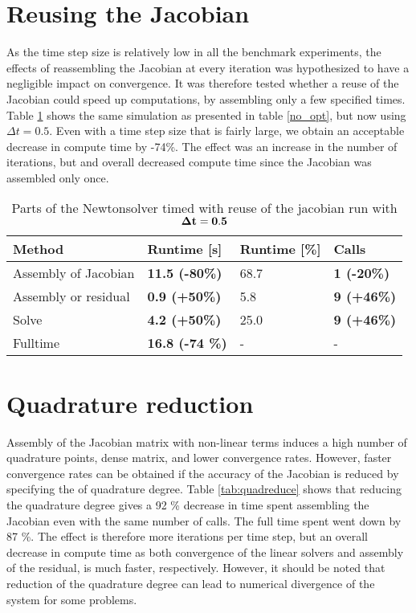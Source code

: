 \section{Reusing the Jacobian}
As the time step size is relatively low in all the benchmark experiments, the effects of reassembling the Jacobian at every iteration was hypothesized to have a negligible impact on convergence. It was therefore tested whether a reuse of the Jacobian could speed up computations, by assembling only a few specified times. Table \ref{jac_reuse} shows the same simulation as presented in table \ref{no_opt}, but now  using $\Delta t = 0.5$. Even with a time step size that is fairly large, we obtain an acceptable decrease in compute time by -74\%. The effect was an increase in the number of iterations, but and overall decreased compute time since the Jacobian was assembled only once. 

\begin{table}[H]
\centering
\caption{Parts of the Newtonsolver timed with reuse of the jacobian run with $\bold{\Delta t = 0.5}$}
\label{jac_reuse}
\begin{tabular}{|l|l|l|l|}
\hline
Method & \textbf{Runtime {[}s{]}} & Runtime {[}\%{]} & \textbf{Calls} \\ \hline
Assembly of Jacobian & \textbf{11.5 (-80\%)} & 68.7 & \textbf{1 (-20\%)} \\ \hline
Assembly or residual & \textbf{0.9 (+50\%)} & 5.8 & \textbf{9 (+46\%)} \\ \hline
Solve & \textbf{4.2 (+50\%)} & 25.0 & \textbf{9 (+46\%)} \\ \hline
Fulltime & \textbf{16.8 (-74 \%)} & - & - \\ \hline
\end{tabular}
\end{table}


\section{Quadrature reduction}
Assembly of the Jacobian matrix with non-linear terms induces a high number of quadrature points, dense matrix, and lower convergence rates. However, faster convergence rates can be obtained if the accuracy of the Jacobian is reduced by specifying the of quadrature degree. Table \ref{tab:quadreduce} shows that reducing the quadrature degree gives a 92 \% decrease in time spent assembling the Jacobian even with the same number of calls. The full time spent went down by 87 \%. The effect is therefore more iterations per time step, but an overall decrease in compute time as both convergence of the linear solvers and assembly of the residual, is much faster, respectively. However, it should be noted that reduction of the quadrature degree can lead to numerical divergence of the system for some problems.\newline

